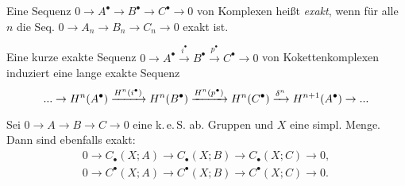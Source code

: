 \documentclass{cheat-sheet}
\newenvironment{centertikzcd}
  {\begin{center}\begin{tikzcd}}
  {\end{tikzcd}\end{center}}
\newcommand{\CC}[1]{{#1}_{\bullet}} %
\newcommand{\CCC}[1]{{#1}^{\bullet}} %
\newcommand{\keS}{k.\,e.\,S.} %
\newcommand{\leS}{l.\,e.\,S.} %
\DeclareMathOperator{\coker}{coker} %
\begin{document}

\begin{defn}
  Eine Sequenz $0 \to \CCC{A} \to \CCC{B} \to \CCC{C} \to 0$ von Komplexen heißt \emph{exakt}, wenn für alle $n$ die Seq. $0 \to A_n \to B_n \to C_n \to 0$ exakt ist.
\end{defn}


\begin{prop}
  Eine kurze exakte Sequenz
  $0 \to \CCC{A} \xrightarrow{i^\bullet} \CCC{B} \xrightarrow{p^\bullet} \CCC{C} \to 0$
  von Kokettenkomplexen induziert eine lange exakte Sequenz
  \[ \nldots \to H^n(\CCC{A}) \xrightarrow{H^n(i^\bullet)} H^n(\CCC{B}) \xrightarrow{H^n(p^\bullet)} H^n(\CCC{C}) \xrightarrow{\delta^n} H^{n+1}(\CCC{A}) \to \nldots \]
\end{prop}

\begin{lem}
  Sei $0 \to A \to B \to C \to 0$ eine \keS{} ab. Gruppen und $X$ eine simpl. Menge.
  Dann sind ebenfalls exakt:
  \begin{align*}
    0 \to \CC{C}(X; A) \to \CC{C}(X; B) \to \CC{C}(X; C) \to 0, \\
    0 \to \CCC{C}(X; A) \to \CCC{C}(X; B) \to \CCC{C}(X; C) \to 0.
  \end{align*}
\end{lem}
\end{document}
